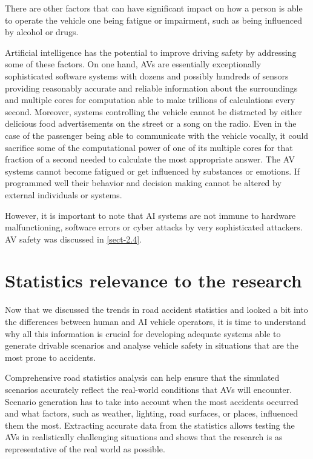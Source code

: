There are other factors that can have significant impact on how a person is able to operate the vehicle one being fatigue or impairment, such as being influenced by alcohol or drugs.

Artificial intelligence has the potential to improve driving safety by addressing some of these factors. On one hand, AVs are essentially exceptionally sophisticated software systems with dozens and possibly hundreds of sensors providing reasonably accurate and reliable information about the surroundings and multiple cores for computation able to make trillions of calculations every second. Moreover, systems controlling the vehicle cannot be distracted by either delicious food advertisements on the street or a song on the radio. Even in the case of the passenger being able to communicate with the vehicle vocally, it could sacrifice some of the computational power of one of its multiple cores for that fraction of a second needed to calculate the most appropriate answer. The AV systems cannot become fatigued or get influenced by substances or emotions. If programmed well their behavior and decision making cannot be altered by external individuals or systems.

However, it is important to note that AI systems are not immune to hardware malfunctioning, software errors or cyber attacks by very sophisticated attackers. AV safety was discussed in \autoref{sect-2.4}.

\section{Statistics relevance to the research} \label{sect-3.3}
Now that we discussed the trends in road accident statistics and looked a bit into the differences between human and AI vehicle operators, it is time to understand why all this information is crucial for developing adequate systems able to generate drivable scenarios and analyse vehicle safety in situations that are the most prone to accidents.

Comprehensive road statistics analysis can help ensure that the simulated scenarios accurately reflect the real-world conditions that AVs will encounter. Scenario generation has to take into account when the most accidents occurred and what factors, such as weather, lighting, road surfaces, or places, influenced them the most. Extracting accurate data from the statistics allows testing the AVs in realistically challenging situations and shows that the research is as representative of the real world as possible.


